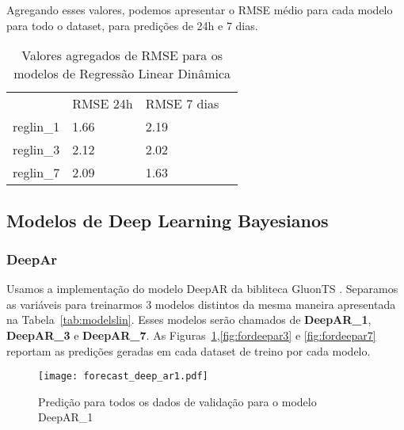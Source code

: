 Agregando esses valores, podemos apresentar o RMSE médio para cada modelo para
todo o dataset, para predições de 24h e 7 dias.

\begin{center}
  \begin{table}[]
    \centering
    \begin{tabular}{l|lll}
      \cline{2-3}
      & \multicolumn{1}{l|}{RMSE 24h} & \multicolumn{1}{l|}{RMSE 7 dias} &  \\ \cline{1-3}
      \multicolumn{1}{|l|}{reglin\_1} & 1.66                          & 2.19                             &  \\ \cline{1-1}
      \multicolumn{1}{|l|}{reglin\_3} & 2.12                          & 2.02                             &  \\ \cline{1-1}
      \multicolumn{1}{|l|}{reglin\_7} & 2.09                          & 1.63                             &  \\ \cline{1-1}
    \end{tabular}
    \caption{Valores agregados de RMSE para os modelos de Regressão Linear Dinâmica}

    \label{tb:rmse_exp}
  \end{table}
\end{center}



\subsection{Modelos de Deep Learning Bayesianos}

\subsubsection{DeepAr}

Usamos a implementação do modelo DeepAR da bibliteca GluonTS \citep{gluonts}. Separamos as variáveis para treinarmos 3 modelos distintos da mesma maneira
apresentada na Tabela~\ref{tab:modelslin}. Esses modelos serão chamados de \textbf{DeepAR\_1}, \textbf{DeepAR\_3} e \textbf{DeepAR\_7}. 
As Figuras~\ref{fig:fordeepar1},\ref{fig:fordeepar3} e \ref{fig:fordeepar7} reportam as
predições geradas em cada dataset de treino por cada modelo.

\begin{figure}[H]
  \centering
  \texttt{[image: forecast\_deep\_ar1.pdf]} 
  \caption{Predição para todos os dados de validação para o modelo DeepAR\_1}
  \label{fig:fordeepar1}
\end{figure}

